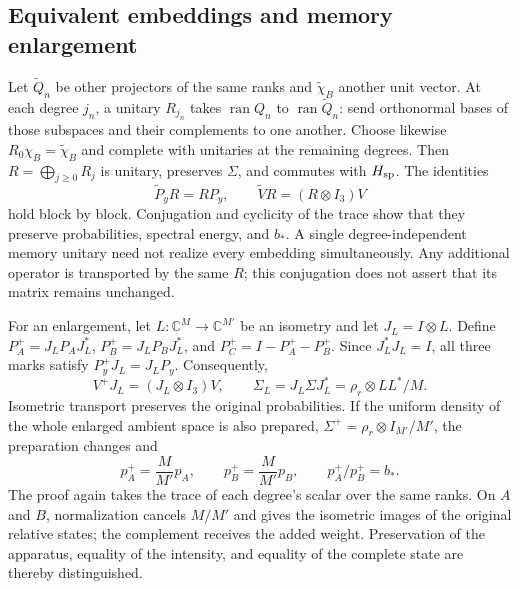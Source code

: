 \subsection{Equivalent embeddings and memory enlargement}
\label{subsec:ii-tins-inclusiones}

Let $\widetilde Q_n$ be other projectors of the same ranks and
$\widetilde \chi_B$ another unit vector. At each degree $j_n$, a unitary
$R_{j_n}$ takes $\operatorname{ran}Q_n$ to
$\operatorname{ran}\widetilde Q_n$: send orthonormal bases of those
subspaces and their complements to one another. Choose likewise
$R_0\chi_B=\widetilde \chi_B$ and complete with unitaries at the remaining
degrees. Then $R=\bigoplus_{j\ge0}R_j$ is unitary, preserves $\Sigma$,
and commutes with $H_{\rm sp}$. The identities
\begin{equation}
 \widetilde P_yR=RP_y,\qquad
 \widetilde V R=(R\otimes I_3)V
 \label{eq:ii-tins-inclusion}
\end{equation}
hold block by block. Conjugation and cyclicity of the trace show that
they preserve probabilities, spectral energy, and $b_*$. A single
degree-independent memory unitary need not realize every embedding
simultaneously. Any additional operator is transported by the same $R$;
this conjugation does not assert that its matrix remains unchanged.

For an enlargement, let $L:\mathbb C^M\to\mathbb C^{M'}$ be an isometry
and let $J_L=I\otimes L$. Define
$P_A^+=J_LP_AJ_L^*$, $P_B^+=J_LP_BJ_L^*$, and
$P_C^+=I-P_A^+-P_B^+$. Since $J_L^*J_L=I$, all three marks satisfy
$P_y^+J_L=J_LP_y$. Consequently,
\begin{equation}
 V^+J_L=(J_L\otimes I_3)V,
 \qquad \Sigma_L=J_L\Sigma J_L^*=\rho_r\otimes LL^*/M.
 \label{eq:ii-tins-extension}
\end{equation}
Isometric transport preserves the original probabilities. If the uniform
density of the whole enlarged ambient space is also prepared,
$\Sigma^+=\rho_r\otimes I_{M'}/M'$, the preparation changes and
\begin{equation}
 p_A^+=\frac{M}{M'}p_A,\qquad
 p_B^+=\frac{M}{M'}p_B,\qquad p_A^+/p_B^+=b_*.
 \label{eq:ii-tins-uniform-extension}
\end{equation}
The proof again takes the trace of each degree's scalar over the same
ranks. On $A$ and $B$, normalization cancels $M/M'$ and gives the
isometric images of the original relative states; the complement receives
the added weight. Preservation of the apparatus, equality of the intensity,
and equality of the complete state are thereby distinguished.


